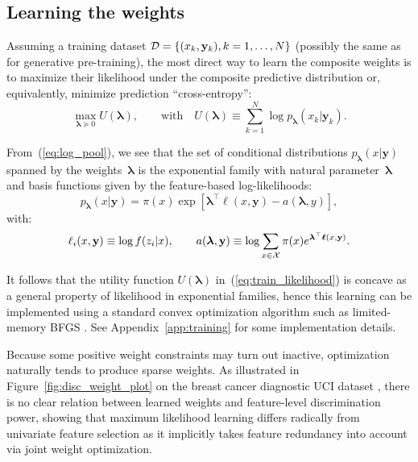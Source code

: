 \documentclass[english]{scrartcl}
\def\y{{\mathbf{y}}}
\newcommand{\blambda}{{\boldsymbol{\lambda}}}
\newcommand{\bell}{{\boldsymbol{\ell}}}
\begin{document}
\subsection{Learning the weights}
\label{sec:learning}

Assuming a training dataset ${\cal D}=\{(x_k,\y_k), k=1,\ldots,N\}$ (possibly the same as for generative pre-training), the most direct way to learn the composite weights is to maximize their likelihood under the composite predictive distribution or, equivalently, minimize prediction ``cross-entropy'':
\begin{equation}
\label{eq:train_likelihood}
\max_{\blambda\succeq 0} U(\blambda),
\qquad \text{with} \quad
U(\blambda) \equiv\sum_{k=1}^N \log p_\blambda(x_k|\y_k).
\end{equation}

From~(\ref{eq:log_pool}), we see that the set of conditional distributions $p_\blambda(x|\y)$ spanned by the weights~$\blambda$ is the exponential family with natural parameter~$\blambda$ and basis functions given by the feature-based log-likelihoods:
$$
p_\blambda(x|\y) = \pi(x) \exp[\blambda^\top \bell(x,\y) - a(\blambda,y)],
$$
with:
$$
\ell_i(x,\y) \equiv \log f(z_i|x),
\qquad
a(\blambda, \y) \equiv \log \sum_{x\in{\cal X}} \pi(x) e^{\blambda^\top \bell(x,\y)}.
$$

It follows that the utility function $U(\blambda)$ in~(\ref{eq:train_likelihood}) is concave as a general property of likelihood in exponential families, hence this learning can be implemented using a standard convex optimization algorithm such as limited-memory BFGS \cite{Byrd-95}. See Appendix~\ref{app:training} for some implementation details. 

Because some positive weight constraints may turn out inactive, optimization naturally tends to produce sparse weights. As illustrated in Figure~\ref{fig:disc_weight_plot} on the breast cancer diagnostic UCI dataset \cite{Wolberg-94}, there is no clear relation between learned weights and feature-level discrimination power, showing that maximum likelihood learning differs radically from univariate feature selection as it implicitly takes feature redundancy into account via joint weight optimization.
\end{document}
